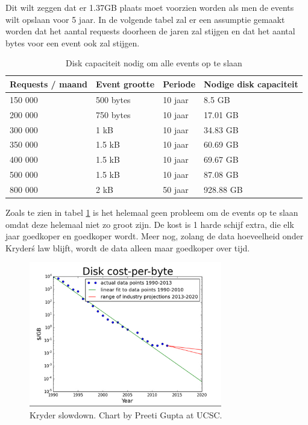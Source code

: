 Dit wilt zeggen dat er 1.37GB plaats moet voorzien worden als men de events wilt opslaan voor 5 jaar. In de volgende tabel zal er een assumptie gemaakt worden dat het aantal requests doorheen de jaren zal stijgen en dat het aantal bytes voor een event ook zal stijgen.

\begin{table}[h]
\centering
\begin{tabular}{@{}llll@{}}
\toprule
Requests / maand & Event grootte & Periode & Nodige disk capaciteit \\ \midrule
150 000 & 500 bytes & 10 jaar & 8.5 GB \\
200 000 & 750 bytes & 10 jaar & 17.01 GB \\
300 000 & 1 kB & 10 jaar & 34.83 GB \\
350 000 & 1.5 kB & 10 jaar & 60.69 GB \\
400 000 & 1.5 kB & 10 jaar & 69.67 GB \\
500 000 & 1.5 kB & 10 jaar & 87.08 GB \\ \midrule
800 000 & 2 kB & 50 jaar & 928.88 GB \\ \bottomrule
\end{tabular}
\caption[Disk capaciteit nodig om alle events op te slaan]{Disk capaciteit nodig om alle events op te slaan\footnotemark}
\label{disk-capaciteit}
\end{table}


Zoals te zien in tabel \ref{disk-capaciteit} is het helemaal geen probleem om de events op te slaan omdat deze helemaal niet zo groot zijn. De kost is 1 harde schijf extra, die elk jaar goedkoper en goedkoper wordt. Meer nog, zolang de data hoeveelheid onder Kryder\'s law blijft, wordt de data alleen maar goedkoper over tijd.

\begin{figure}[h]
\caption{Kryder slowdown. Chart by Preeti Gupta at UCSC.}
\centering
\includegraphics[width=0.75\textwidth]{img/kryder-slowdown}
\end{figure}

